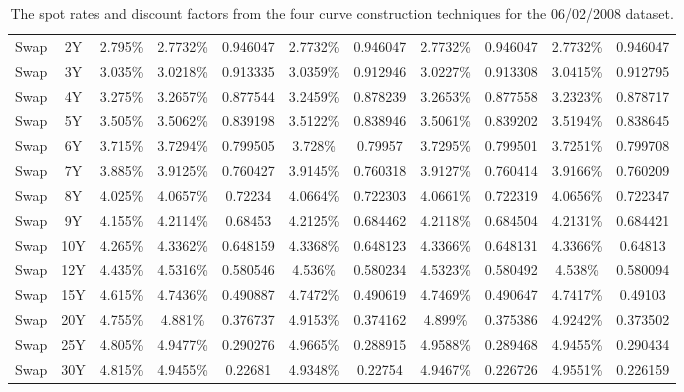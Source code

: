 \begin{landscape}
\begin{table}[ht]
\begin{center}
\begin{tabular}{ccc|cc|cc|cc|cc}
Swap & 2Y & 2.795\% & 2.7732\% & 0.946047 & 2.7732\% & 0.946047 & 2.7732\% & 0.946047 & 2.7732\% & 0.946047 \\
Swap & 3Y & 3.035\% & 3.0218\% & 0.913335 & 3.0359\% & 0.912946 & 3.0227\% & 0.913308 & 3.0415\% & 0.912795 \\
Swap & 4Y & 3.275\% & 3.2657\% & 0.877544 & 3.2459\% & 0.878239 & 3.2653\% & 0.877558 & 3.2323\% & 0.878717 \\
Swap & 5Y & 3.505\% & 3.5062\% & 0.839198 & 3.5122\% & 0.838946 & 3.5061\% & 0.839202 & 3.5194\% & 0.838645 \\
Swap & 6Y & 3.715\% & 3.7294\% & 0.799505 & 3.728\% & 0.79957 & 3.7295\% & 0.799501 & 3.7251\% & 0.799708 \\
Swap & 7Y & 3.885\% & 3.9125\% & 0.760427 & 3.9145\% & 0.760318 & 3.9127\% & 0.760414 & 3.9166\% & 0.760209 \\
Swap & 8Y & 4.025\% & 4.0657\% & 0.72234 & 4.0664\% & 0.722303 & 4.0661\% & 0.722319 & 4.0656\% & 0.722347 \\
Swap & 9Y & 4.155\% & 4.2114\% & 0.68453 & 4.2125\% & 0.684462 & 4.2118\% & 0.684504 & 4.2131\% & 0.684421 \\
Swap & 10Y & 4.265\% & 4.3362\% & 0.648159 & 4.3368\% & 0.648123 & 4.3366\% & 0.648131 & 4.3366\% & 0.64813 \\
Swap & 12Y & 4.435\% & 4.5316\% & 0.580546 & 4.536\% & 0.580234 & 4.5323\% & 0.580492 & 4.538\% & 0.580094 \\
Swap & 15Y & 4.615\% & 4.7436\% & 0.490887 & 4.7472\% & 0.490619 & 4.7469\% & 0.490647 & 4.7417\% & 0.49103 \\
Swap & 20Y & 4.755\% & 4.881\% & 0.376737 & 4.9153\% & 0.374162 & 4.899\% & 0.375386 & 4.9242\% & 0.373502 \\
Swap & 25Y & 4.805\% & 4.9477\% & 0.290276 & 4.9665\% & 0.288915 & 4.9588\% & 0.289468 & 4.9455\% & 0.290434 \\
Swap & 30Y & 4.815\% & 4.9455\% & 0.22681 & 4.9348\% & 0.22754 & 4.9467\% & 0.226726 & 4.9551\% & 0.226159 \\
\toprule

\end{tabular}
\end{center}
\caption[Results|06/02/2008]{The spot rates and discount factors from the four curve construction techniques for the 06/02/2008 dataset.}
\label{tab:results_2}
\end{table}

\end{landscape}

